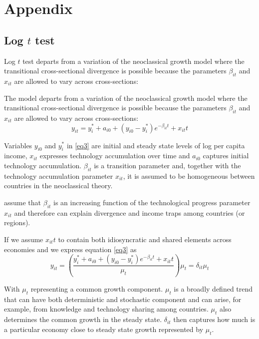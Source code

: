 \documentclass[11pt]{article}
\begin{document}
\newpage



\section{Appendix}

\subsection{Log $t$ test}

Log $t$ test departs from a variation of the neoclassical growth model where the transitional cross-sectional divergence is possible because the parameters $\beta_{it}$ and $x_{it}$ are allowed to vary across cross-sections:

The model departs from a variation of the neoclassical growth model where the transitional cross-sectional divergence is possible because the parameters $\beta_{it}$ and $x_{it}$ are allowed to vary across cross-sections:
\begin{equation} \label{eq3}
 y_{it} = y_i^* + a_{i0} + (y_{i0} - y_i^*)e^{-\beta_{it}t} + x_{it}t 
\end{equation}

 Variables $y_{i0}$ and $y_{i}^{*}$ in \eqref{eq3} are initial and steady state levels of log per capita income, $x_{it}$ expresses technology accumulation over time and $a_{i0}$ captures initial technology accumulation. $\beta_{it}$ is a transition parameter and, together with the technology accumulation parameter $x_{it}$, it is assumed to be homogeneous between countries in the neoclassical theory.

\citeauthor{phillips2007transition} assume that $\beta_{it}$ is an increasing function of the technological progress parameter $x_{it}$ and therefore can explain divergence and income traps among countries (or regions).

If we assume $x_{it}t$ to contain both idiosyncratic and shared elements across economies and we express equation \eqref{eq3} as
\begin{equation} \label{eq4} y_{it} = \left(\frac{ y_i^* + a_{i0} + (y_{i0} - y_i^*)e^{-\beta_{it}t} + x_{it}t}{\mu_t}\right)\mu_t = \delta_{it}\mu_t  \end{equation}


With $\mu_t$ representing a common growth component.
$\mu_t$ is a broadly defined trend that can have both deterministic and stochastic component and can arise, for example, from knowledge and technology sharing among countries. $\mu_t$ also determines the common growth in the steady state. $\delta_{it}$ then captures how much is a particular economy close to steady state growth represented by $\mu_t$.
\end{document}
